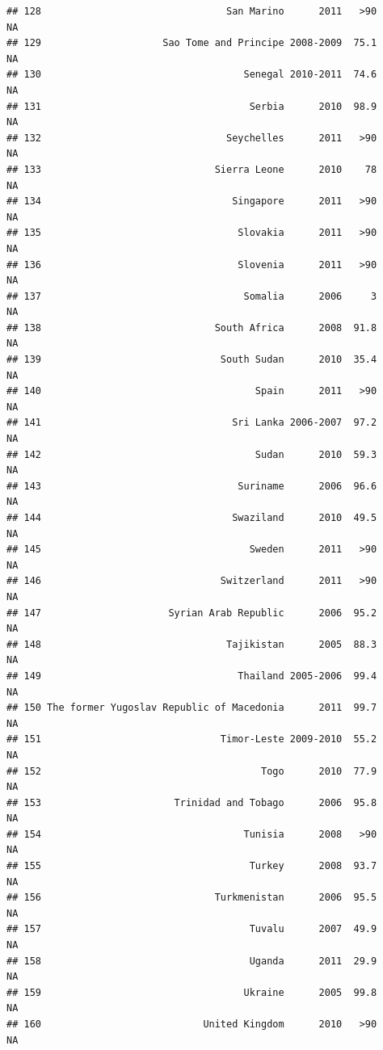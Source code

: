 \documentclass[
]{book}
\begin{document}
\begin{verbatim}
## 128                                San Marino      2011   >90              NA
## 129                     Sao Tome and Principe 2008-2009  75.1              NA
## 130                                   Senegal 2010-2011  74.6              NA
## 131                                    Serbia      2010  98.9              NA
## 132                                Seychelles      2011   >90              NA
## 133                              Sierra Leone      2010    78              NA
## 134                                 Singapore      2011   >90              NA
## 135                                  Slovakia      2011   >90              NA
## 136                                  Slovenia      2011   >90              NA
## 137                                   Somalia      2006     3              NA
## 138                              South Africa      2008  91.8              NA
## 139                               South Sudan      2010  35.4              NA
## 140                                     Spain      2011   >90              NA
## 141                                 Sri Lanka 2006-2007  97.2              NA
## 142                                     Sudan      2010  59.3              NA
## 143                                  Suriname      2006  96.6              NA
## 144                                 Swaziland      2010  49.5              NA
## 145                                    Sweden      2011   >90              NA
## 146                               Switzerland      2011   >90              NA
## 147                      Syrian Arab Republic      2006  95.2              NA
## 148                                Tajikistan      2005  88.3              NA
## 149                                  Thailand 2005-2006  99.4              NA
## 150 The former Yugoslav Republic of Macedonia      2011  99.7              NA
## 151                               Timor-Leste 2009-2010  55.2              NA
## 152                                      Togo      2010  77.9              NA
## 153                       Trinidad and Tobago      2006  95.8              NA
## 154                                   Tunisia      2008   >90              NA
## 155                                    Turkey      2008  93.7              NA
## 156                              Turkmenistan      2006  95.5              NA
## 157                                    Tuvalu      2007  49.9              NA
## 158                                    Uganda      2011  29.9              NA
## 159                                   Ukraine      2005  99.8              NA
## 160                            United Kingdom      2010   >90              NA

\end{verbatim}
\end{document}
